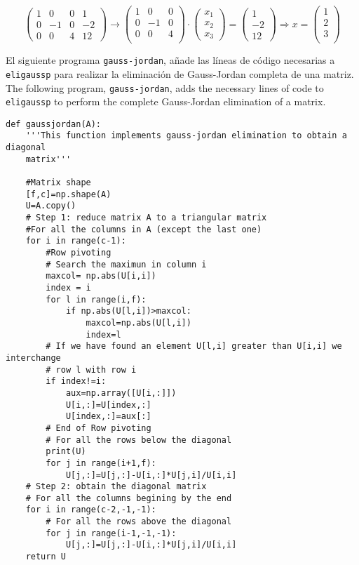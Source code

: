 \begin{equation*}
\begin{pmatrix}
1&     0&     0&    1\\
 0&    -1&    0&    -2\\
 0&     0&     4&    12
\end{pmatrix} \rightarrow \begin{pmatrix}
1&     0&     0\\
 0&    -1&    0\\
 0&     0&     4\\
\end{pmatrix}\cdot\begin{pmatrix}
x_1\\
x_2\\
x_3
\end{pmatrix}=\begin{pmatrix}
1\\
-2\\
12
\end{pmatrix} \Rightarrow x=\begin{pmatrix}
1\\
2\\
3\\
\end{pmatrix}
\end{equation*}

\begin{paracol}{2}
El siguiente programa \texttt{gauss-jordan}, añade las líneas de código necesarias a \texttt{eligaussp} para realizar la eliminación de Gauss-Jordan completa de una matriz.
\switchcolumn
The following program, \texttt{gauss-jordan}, adds the necessary lines of code to \texttt{eligaussp} to perform the complete Gauss-Jordan elimination of a matrix.
\end{paracol}

\begin{verbatim}
def gaussjordan(A):
    '''This function implements gauss-jordan elimination to obtain a diagonal
    matrix'''    
    
    #Matrix shape
    [f,c]=np.shape(A)
    U=A.copy()
    # Step 1: reduce matrix A to a triangular matrix
    #For all the columns in A (except the last one)
    for i in range(c-1):
        #Row pivoting
        # Search the maximun in column i
        maxcol= np.abs(U[i,i])
        index = i
        for l in range(i,f):
            if np.abs(U[l,i])>maxcol:
                maxcol=np.abs(U[l,i])
                index=l
        # If we have found an element U[l,i] greater than U[i,i] we interchange
        # row l with row i
        if index!=i:
            aux=np.array([U[i,:]])
            U[i,:]=U[index,:]
            U[index,:]=aux[:]
        # End of Row pivoting
        # For all the rows below the diagonal
        print(U)
        for j in range(i+1,f):
            U[j,:]=U[j,:]-U[i,:]*U[j,i]/U[i,i]
    # Step 2: obtain the diagonal matrix
    # For all the columns begining by the end
    for i in range(c-2,-1,-1):
        # For all the rows above the diagonal
        for j in range(i-1,-1,-1):
            U[j,:]=U[j,:]-U[i,:]*U[j,i]/U[i,i]
    return U
    
\end{verbatim}

